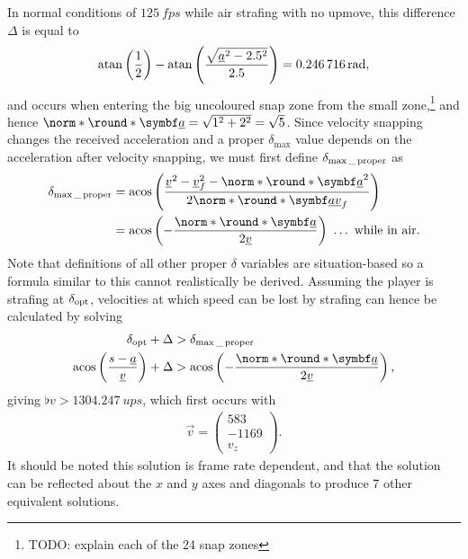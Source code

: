 In normal conditions of $\qty{125}{fps}$ while air strafing with no upmove, this difference $\Delta$ is equal to
\begin{align*}
\atan\left(\frac{1}{2} \right) - \atan\left(\frac{\sqrt{\flat{a}^2 - 2.5^2}}{2.5} \right) = \qty{0.246716}{rad},
\end{align*}
and occurs when entering the big uncoloured snap zone from the small zone,\footnote{TODO: explain each of the 24 snap zones} and hence $\norm*{\round*{\vec{\flat{a}}}} = \sqrt{1^2 + 2^2} = \sqrt{5}$. Since velocity snapping changes the received acceleration and a proper $\delta_{\max}$ value depends on the acceleration after velocity snapping, we must first define $\delta_{\max\_\operatorname{proper}}$ as
\begin{align}
\delta_{\max\_\proper} &= \acos\left(\frac{\flat{v}^2 - \flat{v}_f^2 - \norm*{\round*{\vec{\flat{a}}}}^2}{2\norm*{\round*{\vec{\flat{a}}}}\flat{v}_f} \right)\\\nonumber
&= \acos\left(-\frac{\norm*{\round*{\vec{\flat{a}}}}}{2\flat{v}} \right)\ \ldots\ \text{while in air.}
\end{align}
Note that definitions of all other proper $\delta$ variables are situation-based so a formula similar to this cannot realistically be derived.
Assuming the player is strafing at $\delta_{\operatorname{opt}}$, velocities at which speed can be lost by strafing can hence be calculated by solving
\begin{align*}
\delta_{\opt} + \Delta &> \delta_{\max\_\proper}\\
\acos\left(\frac{s - \flat{a}}{\flat{v}} \right) + \Delta &> \acos\left(-\frac{\norm*{\round*{\vec{\flat{a}}}}}{2\flat{v}} \right),
\end{align*}
giving $\flat{v} > \qty{1304.247}{ups}$, which first occurs with
\begin{align*}
\vec{v} =
\begin{pmatrix}
583 \\ -1169 \\ v_z
\end{pmatrix}.
\end{align*}
It should be noted this solution is frame rate dependent, and that the solution can be reflected about the $x$ and $y$ axes and diagonals to produce 7 other equivalent solutions.
